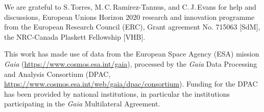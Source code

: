 \documentclass[apjl,twocolumn]{emulateapj}
\DeclareRobustCommand{\Figref}[1]{Fig.~\ref{#1}}
\begin{document}
 \begin{acknowledgements}
   \small
   We are grateful to S.\,Torres, M.\,C.\,Ramirez-Tannus,
   and C.\,J.\,Evans for help and discussions, European Unions Horizon 2020 research and innovation programme from the European Research Council (ERC), Grant agreement No. 715063 [SdM], the NRC-Canada Plaskett Fellowship [VHB].
   
This work has made use of data from the European Space Agency (ESA) mission {\it Gaia} (\url{https://www.cosmos.esa.int/gaia}), processed by the {\it Gaia} Data Processing and Analysis Consortium (DPAC, \url{https://www.cosmos.esa.int/web/gaia/dpac/consortium}). Funding for the DPAC has been provided by national institutions, in particular the institutions
participating in the {\it Gaia} Multilateral Agreement. 
   
 \end{acknowledgements}
\end{document}
